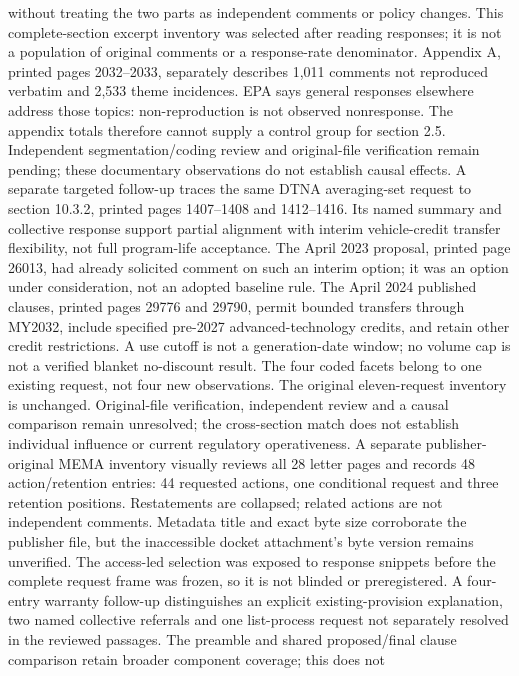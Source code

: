without treating the two parts as independent comments or policy changes.
This complete-section excerpt inventory was selected after reading responses;
it is not a population of original comments or a response-rate denominator.
Appendix A, printed pages 2032--2033, separately describes 1,011 comments not
reproduced verbatim and 2,533 theme incidences. EPA says general responses
elsewhere address those topics: non-reproduction is not observed nonresponse.
The appendix totals therefore cannot supply a control group for section 2.5.
Independent segmentation/coding review and original-file verification remain
pending; these documentary observations do not establish causal effects.
A separate targeted follow-up traces the same DTNA averaging-set request to
section 10.3.2, printed pages 1407--1408 and 1412--1416. Its named summary and
collective response support partial alignment with interim vehicle-credit
transfer flexibility, not full program-life acceptance. The April 2023 proposal,
printed page 26013, had already solicited comment on such an interim option;
it was an option under consideration, not an adopted baseline rule. The April
2024 published clauses, printed pages 29776 and 29790, permit bounded transfers
through MY2032, include specified pre-2027 advanced-technology credits, and
retain other credit restrictions. A use cutoff is not a generation-date window;
no volume cap is not a verified blanket no-discount result. The four coded
facets belong to one existing request, not four new observations. The original
eleven-request inventory is unchanged. Original-file verification, independent
review and a causal comparison remain unresolved; the cross-section match does
not establish individual influence or current regulatory operativeness.
A separate publisher-original MEMA inventory visually reviews all 28 letter
pages and records 48 action/retention entries: 44 requested actions, one
conditional request and three retention positions. Restatements are collapsed;
related actions are not independent comments. Metadata title and exact byte size
corroborate the publisher file, but the inaccessible docket attachment's byte
version remains unverified. The access-led selection was exposed to response
snippets before the complete request frame was frozen, so it is not blinded or
preregistered. A four-entry warranty follow-up distinguishes an explicit
existing-provision explanation, two named collective referrals and one list-process
request not separately resolved in the reviewed passages. The preamble and shared
proposed/final clause comparison retain broader component coverage; this does not
